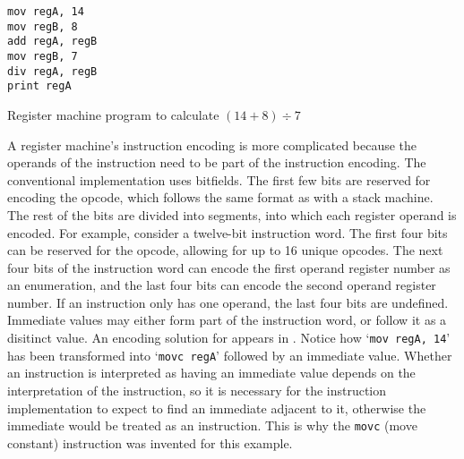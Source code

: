 			\begin{doublefig}
				\begin{halffig}
					\begin{lstlisting}
mov regA, 14
mov regB, 8
add regA, regB
mov regB, 7
div regA, regB
print regA
					\end{lstlisting}
					\caption{Register machine program to calculate $(14+8)\div7$}
					\label{fig:registerprogram}
				\end{halffig}
			\end{doublefig}
			
			A register machine's instruction encoding is more complicated because the operands of the instruction need to be part of the instruction encoding. The conventional implementation uses bitfields. The first few bits are reserved for encoding the opcode, which follows the same format as with a stack machine. The rest of the bits are divided into segments, into which each register operand is encoded. For example, consider a twelve-bit instruction word. The first four bits can be reserved for the opcode, allowing for up to 16 unique opcodes. The next four bits of the instruction word can encode the first operand register number as an enumeration, and the last four bits can encode the second operand register number. If an instruction only has one operand, the last four bits are undefined. Immediate values may either form part of the instruction word, or follow it as a disitinct value. An encoding solution for  appears in . Notice how `\texttt{mov regA, 14}' has been transformed into `\texttt{movc regA}' followed by an immediate value. Whether an instruction is interpreted as having an immediate value depends on the interpretation of the instruction, so it is necessary for the instruction implementation to expect to find an immediate adjacent to it, otherwise the immediate would be treated as an instruction. This is why the \texttt{movc} (move constant) instruction was invented for this example.
			

